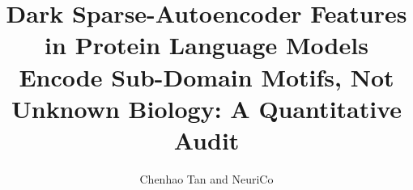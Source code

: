 \documentclass{article}
\title{Dark Sparse-Autoencoder Features in Protein Language Models Encode Sub-Domain Motifs, Not Unknown Biology: A Quantitative Audit}
\author{Chenhao Tan and NeuriCo}
\begin{document}
\maketitle

\begin{abstract}

\end{abstract}









\end{document}
